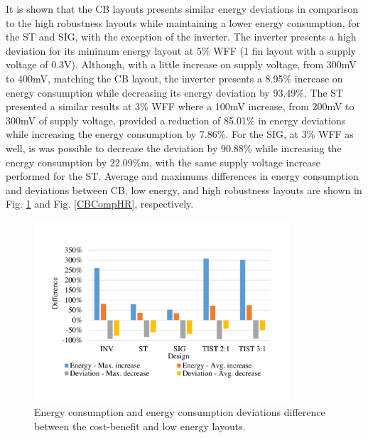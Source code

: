 \documentclass[pgmicro,diss,english]{iiufrgs}
\begin{document}
It is shown that the CB layouts presents similar energy deviations in comparison to the high robustness layouts while maintaining a lower energy consumption, for the ST and SIG, with the exception of the inverter. The inverter presents a high deviation for its minimum energy layout at 5\% WFF (1 fin layout with a supply voltage of 0.3V). Although, with a little increase on supply voltage, from 300mV to 400mV, matching the CB layout, the inverter presents a 8.95\% increase on energy consumption while decreasing its energy deviation by 93.49\%. The ST presented a similar results at 3\% WFF where a 100mV increase, from 200mV to 300mV of supply voltage, provided a reduction of 85.01\% in energy deviations while increasing the energy consumption by 7.86\%. For the SIG, at 3\% WFF as well, is was possible to decrease the deviation by 90.88\% while increasing the energy consumption by 22.09\%m, with the same supply voltage increase performed for the ST. Average and maximums differences in energy consumption and deviations between CB, low energy, and high robustness layouts are shown in Fig. \ref{CBCompLE} and Fig. \ref{CBCompHR}, respectively.

\begin{figure}[t]
	\centering
       	\caption{Energy consumption and energy consumption deviations difference between the cost-benefit and low energy layouts. \label{CBCompLE}}        	  \includegraphics[width=0.85\textwidth, trim={1.25cm 2cm 2cm 3cm}, clip]{compCB-LE.pdf}
\end{figure}
\end{document}
